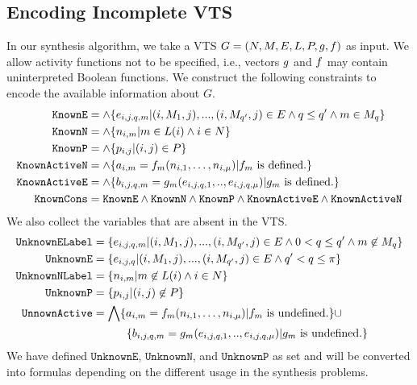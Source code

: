 \subsection{Encoding Incomplete VTS}

In our synthesis algorithm, we take a VTS $G =
(N,M,E,L,P,g,f)$ as input.
%
We allow activity functions not to be specified, i.e., vectors
$g$ and $f$ may contain uninterpreted Boolean functions.
%
We construct the following constraints to encode the available information
about $G$.
%
\begin{align*}
  \texttt{KnownE} &= \land \{e_{i,j,q,m}|(i,M_1,j),...,(i,M_{q'},j) \in E \land q \leq q' \land m \in M_q \}\\
  \texttt{KnownN} &= \land \{n_{i,m}| m \in L(i) \land i \in N \}\\
  \texttt{KnownP} &= \land \{p_{i,j}| (i,j) \in P \} \\
  \texttt{KnownActiveN} &= \land \{ a_{i,m} = f_m (n_{i,1},\dots,n_{i,\mu}) | f_m \text{ is defined.} \} \\
  \texttt{KnownActiveE} &= \land \{ b_{i,j,q,m} = g_m(e_{i,j,q,1}, .., e_{i,j,q,\mu})
                   | g_m \text{ is defined.} \} \\
  \texttt{KnownCons} & = \texttt{KnownE} \land \texttt{KnownN} \land 
 \texttt{KnownP} \land \texttt{KnownActiveE} \land \texttt{KnownActiveN}
\end{align*}
We also collect the variables that are absent in the VTS.
\begin{align*}
  \texttt{UnknownELabel} &=
  \{e_{i,j,q,m}|(i,M_1,j),...,(i,M_{q'},j) \in E \land 
                          0 < q \leq q' \land m \not\in M_{q} \}\\
  \texttt{UnknownE} &= \{e_{i,j,q}|(i,M_1,j),...,(i,M_{q'},j) \in E \land 
                    q' < q \leq \pi \}\\
  \texttt{UnknownNLabel} &= \{n_{i,m}| m \not\in L(i) \land i \in N \}\\
  \texttt{UnknownP} &= \{p_{i,j}| (i,j) \not\in P \} \\
  \texttt{UnnownActive} &=  \bigwedge \{ a_{i,m} = f_m (n_{i,1},\dots,n_{i,\mu}) | f_m \text{ is undefined.} \} {\cup} \\
   &\quad\quad\quad  \{ b_{i,j,q,m} = g_m(e_{i,j,q,1}, .., e_{i,j,q,\mu})
                   | g_m \text{ is undefined.} \}
\end{align*}
We have defined $\texttt{UnknownE}$, $\texttt{UnknownN}$, and
$\texttt{UnknownP}$
as set and will be converted into formulas depending
on the different usage in the synthesis problems. 

